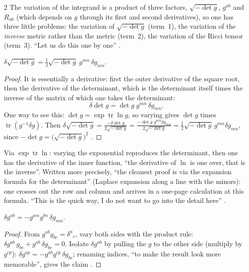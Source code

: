 \begin{paracol}{2}
The variation of the integrand is a product of three factors, $\sqrt{-\det g}$, $g^{ab}$ and $R_{ab}$ (which depends on $g$ through its first and second derivatives), so one has three little problems: the variation of $\sqrt{-\det g}$ (term~1), the variation of the \emph{inverse} metric rather than the metric (term~2), the variation of the Ricci tensor (term~3). ``Let us do this one by one'' .

\begin{lemma}\label{lem:c15-det}
$\delta\sqrt{-\det g}=\tfrac12\sqrt{-\det g}\;g^{mn}\,\delta g_{mn}$.
\end{lemma}
\begin{proof}
It is essentially a derivative: first the outer derivative of the square root, then the derivative of the determinant, which is the determinant itself times the inverse of the matrix of which one takes the determinant:
\[
  \delta\det g=\det g\;g^{mn}\,\delta g_{mn}.
\]
One way to see this: $\det g=\exp\operatorname{tr}\ln g$, so varying gives $\det g$ times $\operatorname{tr}(g^{-1}\delta g)$. Then $\delta\sqrt{-\det g}=\frac{-\delta\det g}{2\sqrt{-\det g}}=\frac{-\det g\;g^{mn}\delta g_{mn}}{2\sqrt{-\det g}}=\tfrac12\sqrt{-\det g}\,g^{mn}\delta g_{mn}$, since $-\det g=\bigl(\sqrt{-\det g}\bigr)^2$ .
\end{proof}
\begin{coursenote}[Student question: why is $\delta\det g=\det g\,g^{mn}\delta g_{mn}$?]
Via $\exp\operatorname{tr}\ln$: varying the exponential reproduces the determinant, then one has the derivative of the inner function, ``the derivative of $\ln$ is one over, that is the inverse''. Written more precisely, ``the cleanest proof is via the expansion formula for the determinant'' (Laplace expansion along a line with the minors): one crosses out the row and column and arrives in a one-page calculation at this formula. ``This is the quick way, I do not want to go into the detail here'' .
\end{coursenote}

\begin{lemma}\label{lem:c15-inv}
$\delta g^{ab}=-g^{am}g^{bn}\,\delta g_{mn}$.
\end{lemma}
\begin{proof}
From $g^{ab}g_{bc}=\delta^a{}_c$, vary both sides with the product rule: $\delta g^{ab}\,g_{bc}+g^{ab}\,\delta g_{bc}=0$. Isolate $\delta g^{ab}$ by pulling the $g$ to the other side (multiply by $g^{cp}$): $\delta g^{ap}=-g^{ab}g^{cp}\,\delta g_{bc}$; renaming indices, ``to make the result look more memorable'', gives the claim .
\end{proof}


\end{paracol}
